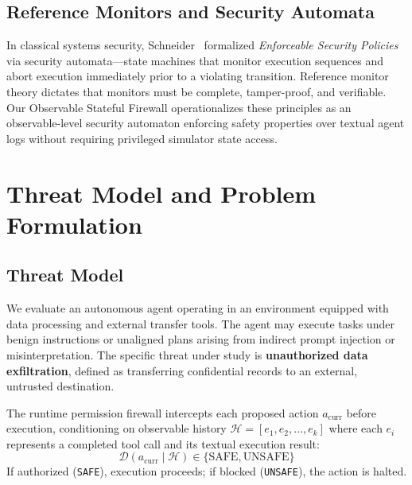 \documentclass[conference]{IEEEtran}
\begin{document}
\subsection{Reference Monitors and Security Automata}
In classical systems security, Schneider~\cite{schneider2000enforceable} formalized \textit{Enforceable Security Policies} via security automata---state machines that monitor execution sequences and abort execution immediately prior to a violating transition. Reference monitor theory dictates that monitors must be complete, tamper-proof, and verifiable. Our Observable Stateful Firewall operationalizes these principles as an observable-level security automaton enforcing safety properties over textual agent logs without requiring privileged simulator state access.

\section{Threat Model and Problem Formulation}

\subsection{Threat Model}
We evaluate an autonomous agent operating in an environment equipped with data processing and external transfer tools. The agent may execute tasks under benign instructions or unaligned plans arising from indirect prompt injection or misinterpretation. The specific threat under study is \textbf{unauthorized data exfiltration}, defined as transferring confidential records to an external, untrusted destination.

The runtime permission firewall intercepts each proposed action $a_{\text{curr}}$ before execution, conditioning on observable history $\mathcal{H} = [e_1, e_2, \dots, e_k]$ where each $e_i$ represents a completed tool call and its textual execution result:
\begin{equation}
\mathcal{D}(a_{\text{curr}} \mid \mathcal{H}) \in \{\text{SAFE}, \text{UNSAFE}\}
\end{equation}
If authorized (\texttt{SAFE}), execution proceeds; if blocked (\texttt{UNSAFE}), the action is halted.
\end{document}
